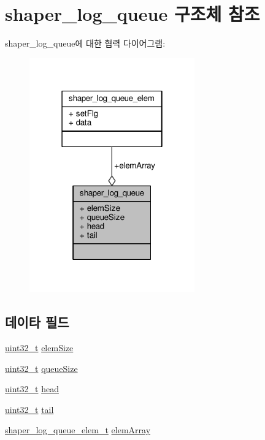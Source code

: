 \hypertarget{structshaper__log__queue}{}\section{shaper\+\_\+log\+\_\+queue 구조체 참조}
\label{structshaper__log__queue}


shaper\+\_\+log\+\_\+queue에 대한 협력 다이어그램\+:
\nopagebreak
\begin{figure}[H]
\begin{center}
\leavevmode
\includegraphics[width=202pt]{structshaper__log__queue__coll__graph}
\end{center}
\end{figure}
\subsection*{데이타 필드}
\begin{DoxyCompactItemize}
\item 
\hyperlink{parse_8c_a6eb1e68cc391dd753bc8ce896dbb8315}{uint32\+\_\+t} \hyperlink{structshaper__log__queue_adcb87f2809f48c3f44fc756c261ecde1}{elem\+Size}
\item 
\hyperlink{parse_8c_a6eb1e68cc391dd753bc8ce896dbb8315}{uint32\+\_\+t} \hyperlink{structshaper__log__queue_acdc388d91657198c5b07921a3d849f23}{queue\+Size}
\item 
\hyperlink{parse_8c_a6eb1e68cc391dd753bc8ce896dbb8315}{uint32\+\_\+t} \hyperlink{structshaper__log__queue_ac8143ecb1dda85e708e5252e0106dd13}{head}
\item 
\hyperlink{parse_8c_a6eb1e68cc391dd753bc8ce896dbb8315}{uint32\+\_\+t} \hyperlink{structshaper__log__queue_a3da51da0aebd2ac8b1ab802259126311}{tail}
\item 
\hyperlink{shaper__log__queue_8h_a5ec7c4224a8c4ab1a988be891ac77300}{shaper\+\_\+log\+\_\+queue\+\_\+elem\+\_\+t} \hyperlink{structshaper__log__queue_afe814895f352c04859b102386d68a966}{elem\+Array}
\end{DoxyCompactItemize}


